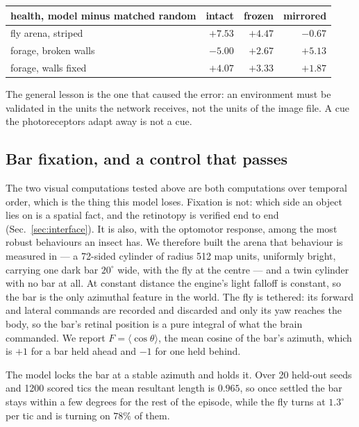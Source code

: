 \documentclass[10pt,twoside]{article}
\begin{document}
\begin{center}
\small
\begin{tabular}{lrrr}
\toprule
health, model minus matched random & intact & frozen & mirrored\\
\midrule
fly arena, striped      & $+7.53$ & $+4.47$ & $-0.67$\\
forage, broken walls    & $-5.00$ & $+2.67$ & $\mathbf{+5.13}$\\
forage, walls fixed     & $+4.07$ & $+3.33$ & $+1.87$\\
\bottomrule
\end{tabular}
\end{center}

The general lesson is the one that caused the error: an environment must be
validated in the units the network receives, not the units of the image file.
A cue the photoreceptors adapt away is not a cue.

\subsection{Bar fixation, and a control that passes}
\label{sec:fixation}

The two visual computations tested above are both computations over temporal
order, which is the thing this model loses. Fixation is not: which side an
object lies on is a spatial fact, and the retinotopy is verified end to end
(Sec.~\ref{sec:interface}). It is also, with the optomotor response, among
the most robust behaviours an insect has. We therefore built the arena that
behaviour is measured in --- a 72-sided cylinder of radius 512 map units,
uniformly bright, carrying one dark bar $20^\circ$ wide, with the fly at the
centre --- and a twin cylinder with no bar at all. At constant distance the
engine's light falloff is constant, so the bar is the only azimuthal feature in
the world. The fly is tethered: its forward and lateral commands are recorded
and discarded and only its yaw reaches the body, so the bar's retinal position
is a pure integral of what the brain commanded. We report
$F = \langle\cos\theta\rangle$, the mean cosine of the bar's azimuth, which is
$+1$ for a bar held ahead and $-1$ for one held behind.

The model locks the bar at a stable azimuth and holds it. Over 20 held-out
seeds and 1200 scored tics the mean resultant length is $0.965$, so once
settled the bar stays within a few degrees for the rest of the episode, while
the fly turns at $1.3^\circ$ per tic and is turning on $78\%$ of them.
\end{document}
